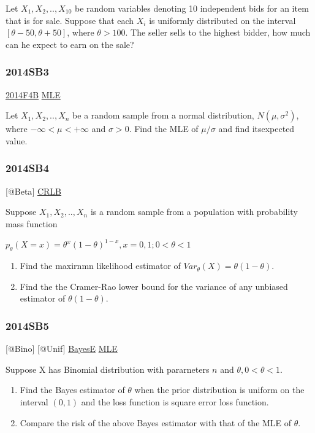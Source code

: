 \documentclass[10pt,twocolumn,portrait]{article}
\begin{document}
Let \(X_1,X_2,..,X_{10}\) be random variables denoting 10 independent
bids for an item that is for sale. Suppose that each \(X_i\) is
uniformly distributed on the interval \([\theta-50,\theta+50]\), where
\(\theta>100\). The seller sells to the highest bidder, how much can he
expect to earn on the sale?

\hypertarget{sb3-2}{%
\subsubsection{2014SB3}\label{sb3-2}}

\protect\hyperlink{f4b-1}{2014F4B} \protect\hyperlink{MLE}{MLE}

Let \(X_1,X_2,..,X_{n}\) be a random sample from a normal distribution,
\(N(\mu,\sigma^2)\), where \(-\infty<\mu<+\infty\) and \(\sigma>0\).
Find the MLE of \(\mu/\sigma\) and find itsexpected value.

\hypertarget{sb4-1}{%
\subsubsection{2014SB4}\label{sb4-1}}

{[}@Beta{]} \protect\hyperlink{section-5}{CRLB}

Suppose \(X_1,X_2,..,X_{n}\) is a random sample from a population with
probability mass function

\(p_\theta(X=x)=\theta^{x}(1-\theta)^{1-x},x=0,1; 0<\theta<1\)

\begin{enumerate}
\def\labelenumi{(\alph{enumi})}
\item
  Find the maxirnmn likelihood estimator of
  \(Var_\theta(X) =\theta(1-\theta)\).
\item
  Find the the Cramer-Rao lower bound for the variance of any unbiased
  estimator of \(\theta(1-\theta)\).
\end{enumerate}

\hypertarget{sb5}{%
\subsubsection{2014SB5}\label{sb5}}

{[}@Bino{]} {[}@Unif{]} \protect\hyperlink{BayesE}{BayesE}
\protect\hyperlink{MLE}{MLE}

Suppose X has Binomial distribution with pararneters \(n\) and
\(\theta, 0<\theta<1\).

\begin{enumerate}
\def\labelenumi{(\alph{enumi})}
\item
  Find the Bayes estimator of \(\theta\) when the prior distribution is
  uniform on the interval \((0,1)\) and the loss function is square
  error loss function.
\item
  Compare the risk of the above Bayes estimator with that of the MLE of
  \(\theta\).
\end{enumerate}
\end{document}
